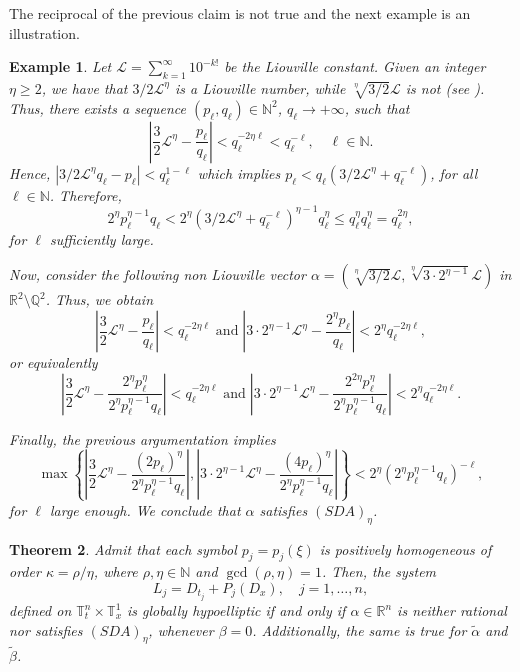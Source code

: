 \documentclass[12pt]{elsarticle}
\newtheorem{theorem}{Theorem}[section]
\newtheorem{example}[theorem]{Example}
\numberwithin{equation}{section}
\begin{document}
The reciprocal of the previous claim is not true and the next example is an illustration. 

\begin{example}\label{SDA example}
	Let $\mathscr{L}=\sum_{k=1}^{\infty}10^{-k!}$ be  the Liouville constant. Given an integer $\eta\geq 2$, we have that $3/2 \mathscr{L}^\eta$ is a Liouville number, while $\sqrt[\eta]{3/2}\mathscr{L}$ is not (see \cite{Marques}). Thus, there exists  a sequence $(p_\ell,q_\ell)\in\mathbb{N}^2$, $q_\ell\rightarrow +\infty$,  such that 
	$$
	\left|\dfrac{3}{2}\mathscr{L}^{\eta}-\dfrac{p_\ell}{q_\ell}\right|< q_\ell^{-2\eta \ell}< q_{\ell}^{-\ell}, \quad \ell \in\mathbb{N}.
	$$
	Hence, $|3/2\mathscr{L}^{\eta} q_\ell-p_\ell|<q_{\ell}^{1-\ell}$ which implies 
	$p_\ell<q_\ell(3/2\mathscr{L}^{\eta}+q_\ell^{-\ell})$,
	for all $\ell \in\mathbb{N}$. Therefore, 
	$$
	2^{\eta}p_\ell^{\eta-1}q_\ell< 2^{\eta}(3/2\mathscr{L}^{\eta}+q_{\ell}^{-\ell})^{\eta-1}q_\ell^{\eta}\leq q_\ell^{\eta} q_\ell^{\eta}=q_\ell^{2\eta},
	$$ for $\ell$ sufficiently large.
	
	Now, consider the following  non Liouville vector $\alpha=(\sqrt[\eta]{3/2}\mathscr{L},\sqrt[\eta]{3\cdot2^{\eta-1}}\mathscr{L})$ in $\mathbb{R}^2\setminus\mathbb{Q}^2$. 
	Thus, we obtain 
	$$
	\left|\dfrac{3}{2}\mathscr{L}^{\eta} -\dfrac{p_\ell}{q_\ell}\right|< q_\ell^{-2\eta\ell}\; \text{and}\; \left|3\cdot2^{\eta-1}\mathscr{L}^{\eta} -\dfrac{2^{\eta}p_\ell}{q_\ell}\right|< 2^{\eta} q_\ell^{-2\eta\ell},
	$$
	or equivalently
	$$
	\left|\dfrac{3}{2}\mathscr{L}^{\eta} -\dfrac{2^{\eta} p_\ell^{\eta}}{2^{\eta}p_\ell^{\eta-1} q_\ell}\right|< q_\ell^{-2\eta\ell}\;\text{and}\; \left|3\cdot2^{\eta-1}\mathscr{L}^{\eta} -\dfrac{2^{2\eta}p_\ell^{\eta}}{2^{\eta}p_\ell^{\eta-1} q_\ell}\right|< 2^{\eta} q_\ell^{-2\eta\ell}.
	$$
	
	Finally, the previous argumentation implies  
	$$
	\max \left\{ \left|\dfrac{3}{2}\mathscr{L}^{\eta} -\dfrac{(2 p_\ell)^{\eta}}{2^{\eta}p_\ell^{\eta-1} q_\ell}\right|,
	\left|3\cdot2^{\eta-1}\mathscr{L}^{\eta} -\dfrac{(4p_\ell)^{\eta}}{2^{\eta}p_\ell^{\eta-1} q_\ell}\right| \right\}
	< 2^{\eta} (2^{\eta}p_\ell^{\eta-1} q_\ell)^{-\ell},
	$$
	for $\ell$ large enough. We conclude  that $\alpha$ satisfies $(SDA)_\eta$.
\end{example}




\begin{theorem}\label{homogeneous hypoellipticity}
	Admit that each symbol   $p_j=p_j(\xi)$ is positively homogeneous  of order $\kappa=\rho/\eta$, where  $\rho,\eta\in\mathbb{N}$ and $\gcd(\rho,\eta)=1$. Then, the system 
	$$ 
	L_j=D_{t_j}+P_j(D_x),\quad j=1,\ldots,n,
	$$
	defined on $\mathbb{T}_t^n\times \mathbb{T}_x^1$
	is globally hypoelliptic if and only if  $\alpha\in\mathbb{R}^n$ is neither rational nor satisfies $(SDA)_{\eta}$, whenever $\beta=0$. 
	Additionally, the same is true for $\widetilde{\alpha}$ and $\widetilde{\beta}$.	
\end{theorem}
\end{document}
